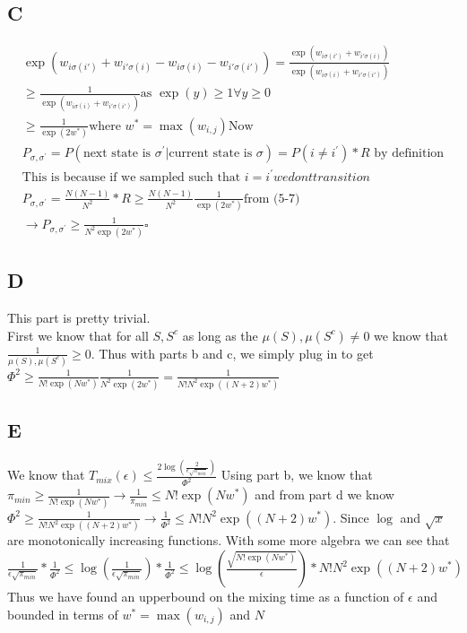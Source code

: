\documentclass[12pt]{article}
\begin{document}
\begin{section}{8.1}
	\subsection{C}
	\begin{gather}
		\exp(w_{i\sigma(i')}+w_{i'\sigma(i)}-w_{i\sigma(i)}-w_{i'\sigma(i')}) = \frac{\exp(w_{i\sigma(i')}+w_{i'\sigma(i)})}{\exp(w_{i\sigma(i)}+w_{i'\sigma(i')})}\\
		\ge \frac{1}{\exp(w_{i\sigma(i)}+w_{i'\sigma(i')})} \text{as } \exp(y)\ge 1 \forall y \ge 0\\
		\ge \frac{1}{\exp(2w^*)} \text{where } w^*=\max(w_{i,j})
		\text{Now}
		\\
		P_{\sigma,\sigma^\prime}=P(\text{next state is }\sigma^\prime | \text{current state is }\sigma) =P(i\ne i^\prime)*R \text{  by definition}\\
		\text{This is because if we sampled such that } i=i^\prime we dont transition\\
		P_{\sigma,\sigma^\prime} = \frac{N(N-1)}{N^2}*R \ge  \frac{N(N-1)}{N^2}\frac{1}{\exp(2w^*)} \text{from (5-7)}\\
		\rightarrow P_{\sigma,\sigma^\prime} \ge \frac{1}{N^2\exp(2w^*)} \square
	\end{gather}
	
	\subsection{D}
	This part is pretty trivial.\\
	First we know that for all $S,S^c$ as long as the $\mu(S),\mu(S^c) \ne 0$ we know that $\frac{1}{\mu(S),\mu(S^c)}\ge 0 $. Thus with parts b and c, we simply plug in to get 
	$\Phi^2 \ge \frac{1}{N!\exp(Nw^*)} \frac{1}{N^2\exp(2w^*)}=\frac{1}{N!N^2\exp((N+2)w^*)}$
	\subsection{E}
	We know that $T_{mix}(\epsilon)\le \frac{2\log(\frac{2}{\epsilon\sqrt{\pi_{min}}})}{\Phi^2}$ Using part b, we know that $\pi_{min}\ge \frac{1}{N!\exp(Nw^*)} \rightarrow \frac{1}{\pi_{min}} \le N!\exp(Nw^*)$ and from part d we know 	$\Phi^2 \ge \frac{1}{N!N^2\exp((N+2)w^*)} \rightarrow \frac{1}{\Phi^2}\le N!N^2\exp((N+2)w^*)$. Since $\log$ and $\sqrt{x}$ are monotonically increasing functions. With some more algebra we can see that $\frac{1}{\epsilon\sqrt{\pi_{min}}}*\frac{1}{\Phi^2}\le\log(\frac{1}{\epsilon\sqrt{\pi_{min}}})*\frac{1}{\Phi^2}\le \log(\frac{\sqrt{N!\exp(Nw^*)}}{\epsilon})* N!N^2\exp((N+2)w^*)$\\
	Thus we have found an upperbound on the mixing time as a function of $\epsilon$ and bounded in terms of $w^*=\max(w_{i,j})$ and $N$
\end{section}
	
\end{document}
